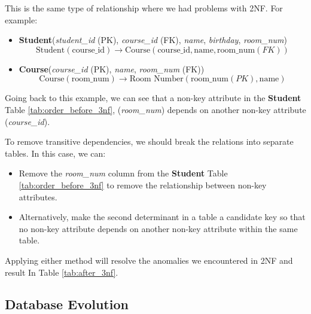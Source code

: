 This is the same type of relationship where we had problems with 2NF. For example:

\begin{itemize}
    \item \textbf{Student}(\textit{student\_id} (PK), \textit{course\_id} (FK), \textit{name}, \textit{birthday}, \textit{room\_num}) 
    \[
    \text{Student}(\text{course\_id}) \rightarrow \text{Course}(\text{course\_id}, \text{name}, \text{room\_num} (FK))
    \]
    
    \item \textbf{Course}(\textit{course\_id} (PK), \textit{name}, \textit{room\_num} (FK)) 
    \[
    \text{Course}(\text{room\_num}) \rightarrow \text{Room Number}(\text{room\_num} (PK), \text{name})
    \]
\end{itemize}

Going back to this example, we can see that a non-key attribute in the \textbf{Student} Table \ref{tab:order_before_3nf}, (\textit{room\_num}) depends on another non-key attribute (\textit{course\_id}).  

To remove transitive dependencies, we should break the relations into separate tables. In this case, we can:

\begin{itemize}
    \item Remove the \textit{room\_num} column from the \textbf{Student} Table \ref{tab:order_before_3nf} to remove the relationship between non-key attributes.
    \item Alternatively, make the second determinant in a table a candidate key so that no non-key attribute depends on another non-key attribute within the same table.
\end{itemize}

Applying either method will resolve the anomalies we encountered in 2NF and result In Table \ref{tab:after_3nf}.







\subsection[Database Evolution]{Database Evolution}

